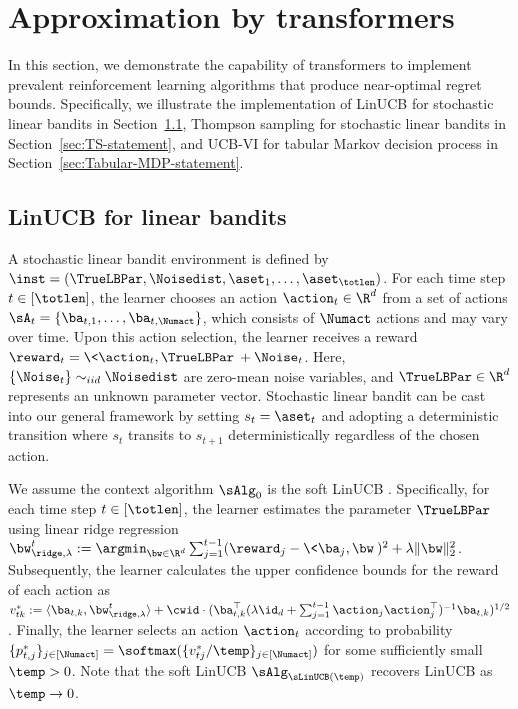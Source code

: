 \documentclass[10pt]{article}
\begin{document}
\section{Approximation by transformers}\label{sec:ICRL}

In this section, we demonstrate the capability of transformers to implement prevalent reinforcement learning algorithms that produce near-optimal regret bounds. Specifically, we illustrate the implementation of LinUCB for stochastic linear bandits in Section~\ref{sec:LinUCB-statement}, Thompson sampling for stochastic linear bandits in Section~\ref{sec:TS-statement}, and UCB-VI for tabular Markov decision process in Section~\ref{sec:Tabular-MDP-statement}. %

\subsection{LinUCB for linear bandits}\label{sec:LinUCB-statement}

A stochastic linear bandit environment is defined by $\inst=(\TrueLBPar,\Noisedist,\aset_1,\ldots,\aset_\totlen)$. For each time step $t\in[\totlen]$, the learner chooses an action $\action_t\in\R^{d}$ from a set of actions $\sA_t=\{\ba_{t,1},\ldots,\ba_{t,\Numact}\}$, which consists of $\Numact$ actions and may vary over time. Upon this action selection, the learner receives a reward $\reward_t=\<\action_t,\TrueLBPar\>+\Noise_t$. Here,$\{ \Noise_t \} \sim_{ iid} \Noisedist$ are zero-mean noise variables, and $\TrueLBPar\in\R^{d}$ represents an unknown parameter vector. Stochastic linear bandit can be cast into our general framework by setting $s_t = \aset_t$ and adopting a deterministic transition where $s_t$ transits to $s_{t+1}$ deterministically regardless of the chosen action.




We assume the context algorithm $\sAlg_0$ is the soft LinUCB \citep{chu2011contextual}. Specifically, for each time step $t\in[\totlen]$, the learner estimates the parameter $\TrueLBPar$ using linear ridge regression $\bw^t_{\ridge,\lambda}:=\argmin_{\bw\in\R^d} \sum_{j=1}^{t-1}(\reward_j-\<\ba_j,\bw\>)^2+ \lambda \|\bw\|_2^2$. Subsequently, the learner calculates the upper confidence bounds for the reward of each action as $v^*_{tk}:=\langle \ba_{t,k},\bw^t_{\ridge,\lambda}\rangle +\cwid \cdot (\ba_{t,k}^\top (\lambda\id_d+\sum_{j=1}^{t-1}\action_j\action_j^\top)^{-1}  \ba_{t,k})^{1/2}$. Finally, the learner selects an action $\action_t$ according to probability $\{ p^*_{t,j} \}_{j \in [\Numact]} = \softmax(\{v^*_{tj}/\temp \}_{j \in [\Numact]})$ for some sufficiently small $\temp>0$. Note that the soft LinUCB $\sAlg_{\sLinUCB(\temp)}$ recovers LinUCB as $\temp\to 0$.
\end{document}
